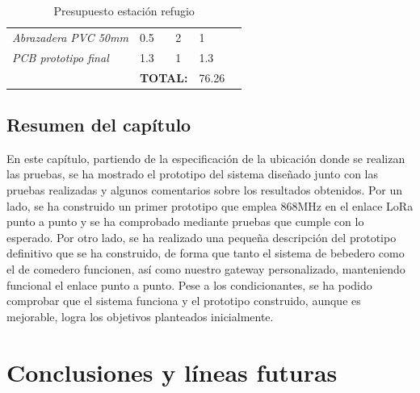 \documentclass[12pt]{article}
\begin{document}
\begin{table}[h!]
\begin{tabular}{l|l|l|l|l}
			\multicolumn{1}{|l|}{\textit{Abrazadera PVC 50mm}}              & 0.5                                                  & 2                                      & 1                                               &  \\ \cline{1-4}
			\multicolumn{1}{|l|}{\textit{PCB prototipo final}}              & 1.3                                                  & 1                                      & 1.3                                             &  \\ \cline{1-4}
			\multicolumn{1}{r|}{}                                           & \multicolumn{2}{r|}{\textbf{TOTAL:}}                                                          & 76.26                                           &  \\ \cline{2-4}
		\end{tabular}
		\caption{Presupuesto estación refugio}
		\label{tab:estacion-refugio}
	\end{table}
	
	\pagebreak
	
	\subsection[Resumen del capítulo]{Resumen del capítulo}
	
	\noindent En este capítulo, partiendo de la especificación de la ubicación donde se realizan las pruebas, se ha mostrado el prototipo del sistema diseñado junto con las pruebas realizadas y algunos comentarios sobre los resultados obtenidos. Por un lado, se ha construido un primer prototipo que emplea 868MHz en el enlace LoRa punto a punto y se ha comprobado mediante pruebas que cumple con lo esperado. Por otro lado, se ha realizado una pequeña descripción del prototipo definitivo que se ha construido, de forma que tanto el sistema de bebedero como el de comedero funcionen, así como nuestro gateway personalizado, manteniendo funcional el enlace punto a punto. Pese a los condicionantes, se ha podido comprobar que el sistema funciona y el prototipo construido, aunque es mejorable, logra los objetivos planteados inicialmente. \\
	
	\pagebreak
	
	\section[Conclusiones y líneas futuras]{Conclusiones y líneas futuras}
	\label{sec: conclusiones}
	
\end{document}
